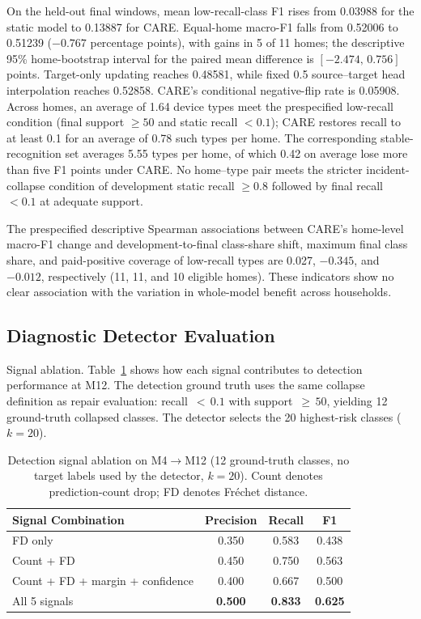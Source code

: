 \documentclass[journal]{IEEEtran}
\newcommand{\ours}{CARE}  %
\begin{document}
On the held-out final windows, mean low-recall-class F1 rises from 0.03988 for the static model to 0.13887 for \ours{}. Equal-home macro-F1 falls from 0.52006 to 0.51239 ($-0.767$ percentage points), with gains in 5 of 11 homes; the descriptive 95\% home-bootstrap interval for the paired mean difference is $[-2.474,\,0.756]$ points. Target-only updating reaches 0.48581, while fixed 0.5 source--target head interpolation reaches 0.52858. CARE's conditional negative-flip rate is 0.05908. Across homes, an average of 1.64 device types meet the prespecified low-recall condition (final support ${\geq}50$ and static recall $<0.1$); CARE restores recall to at least 0.1 for an average of 0.78 such types per home. The corresponding stable-recognition set averages 5.55 types per home, of which 0.42 on average lose more than five F1 points under CARE. No home--type pair meets the stricter incident-collapse condition of development static recall ${\geq}0.8$ followed by final recall $<0.1$ at adequate support.

The prespecified descriptive Spearman associations between CARE's home-level macro-F1 change and development-to-final class-share shift, maximum final class share, and paid-positive coverage of low-recall types are 0.027, $-0.345$, and $-0.012$, respectively (11, 11, and 10 eligible homes). These indicators show no clear association with the variation in whole-model benefit across households.

\subsection{Diagnostic Detector Evaluation}
\label{sec:detection_eval}

Signal ablation.
Table~\ref{tab:detect_signals} shows how each signal contributes to detection performance at M12.
The detection ground truth uses the same collapse definition as repair evaluation: recall~${<}\,0.1$ with support~${\geq}\,50$, yielding 12 ground-truth collapsed classes.
The detector selects the 20 highest-risk classes ($k{=}20$).

\begin{table}[!htbp]
\centering
\caption{Detection signal ablation on M4$\to$M12 (12 ground-truth classes, no target labels used by the detector, $k{=}20$). Count denotes prediction-count drop; FD denotes Fr\'{e}chet distance.}
\label{tab:detect_signals}
\small
\begin{tabular}{@{}l ccc@{}}
\toprule
Signal Combination & Precision & Recall & F1 \\
\midrule
FD only & 0.350 & 0.583 & 0.438 \\
Count + FD & 0.450 & 0.750 & 0.563 \\
Count + FD + margin + confidence & 0.400 & 0.667 & 0.500 \\
All 5 signals & \textbf{0.500} & \textbf{0.833} & \textbf{0.625} \\
\bottomrule
\end{tabular}
\end{table}
\end{document}
